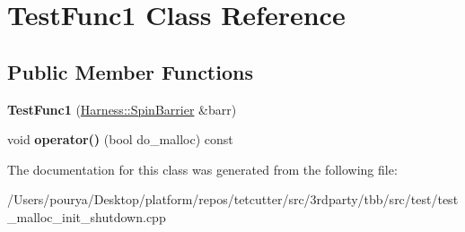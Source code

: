 \hypertarget{classTestFunc1}{}\section{Test\+Func1 Class Reference}
\label{classTestFunc1}
\subsection*{Public Member Functions}
\begin{DoxyCompactItemize}
\item 
\hypertarget{classTestFunc1_aee870f56aae84b1a15b931c71bee7f80}{}{\bfseries Test\+Func1} (\hyperlink{classHarness_1_1SpinBarrier}{Harness\+::\+Spin\+Barrier} \&barr)\label{classTestFunc1_aee870f56aae84b1a15b931c71bee7f80}

\item 
\hypertarget{classTestFunc1_a580268e85a9156d14cb1949b428bbbb9}{}void {\bfseries operator()} (bool do\+\_\+malloc) const \label{classTestFunc1_a580268e85a9156d14cb1949b428bbbb9}

\end{DoxyCompactItemize}


The documentation for this class was generated from the following file\+:\begin{DoxyCompactItemize}
\item 
/\+Users/pourya/\+Desktop/platform/repos/tetcutter/src/3rdparty/tbb/src/test/test\+\_\+malloc\+\_\+init\+\_\+shutdown.\+cpp\end{DoxyCompactItemize}
